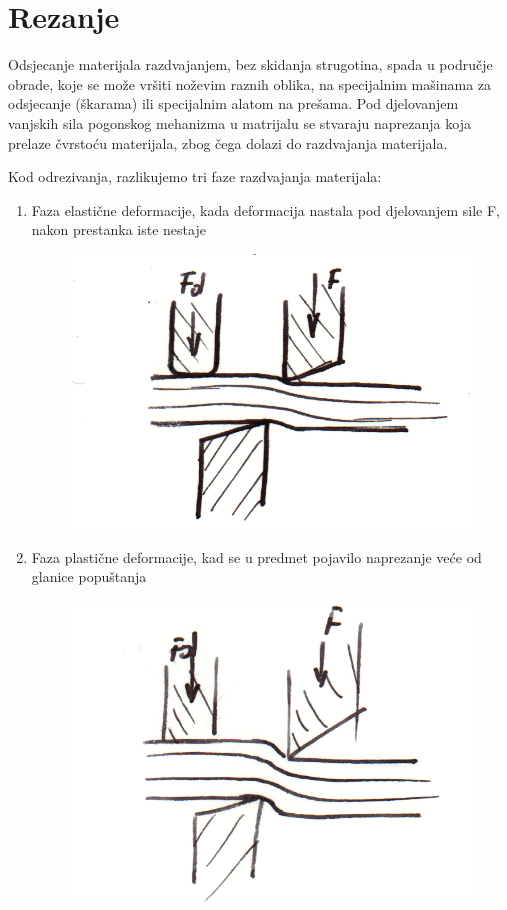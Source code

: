 \documentclass[a4paper,12pt]{article}
\numberwithin{figure}{section}
\begin{document}
\section{Rezanje}
Odsjecanje materijala razdvajanjem, bez skidanja strugotina, spada u područje obrade, koje se može vršiti noževim raznih oblika, na specijalnim mašinama za odsjecanje (škarama) ili specijalnim alatom na prešama. Pod djelovanjem vanjskih sila pogonskog mehanizma u matrijalu se stvaraju naprezanja koja prelaze čvrstoću materijala, zbog čega dolazi do razdvajanja materijala. \par
Kod odrezivanja, razlikujemo tri faze razdvajanja materijala:
\begin{enumerate}
\item Faza elastične deformacije, kada deformacija nastala pod djelovanjem sile F, nakon prestanka iste nestaje
\begin{figure}[!h]
\centering
\includegraphics[scale=0.15]{image_53-1.png}
\end{figure}
\FloatBarrier
\item Faza plastične deformacije, kad se u predmet pojavilo naprezanje veće od glanice popuštanja
\begin{figure}[!h]
\centering
\includegraphics[scale=0.15]{image_53-2.png}

\end{figure}
\end{enumerate}
\end{document}
